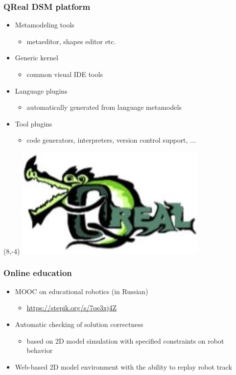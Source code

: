\documentclass[xetex,mathserif,serif]{beamer}
\begin{document}
	\begin{frame}
		\frametitle{QReal DSM platform}
		\begin{itemize}
			\item Metamodeling tools
			\begin{itemize}
				\item metaeditor, shapes editor etc.
			\end{itemize}
			\item Generic kernel
			\begin{itemize}
				\item common visual IDE tools
			\end{itemize}
			\item Language plugins
			\begin{itemize}
				\item automatically generated from language metamodels
			\end{itemize}
			\item Tool plugins
			\begin{itemize}
				\item code generators, interpreters, version control support, ...
			\end{itemize}
		\end{itemize}
		\begin{textblock}{2}(8,-4)
			\includegraphics[width=\textwidth]{qrealLogo.png}
		\end{textblock}
	\end{frame}

	\begin{frame}
		\frametitle{Online education}
		\begin{itemize}
			\item MOOC on educational robotics (in Russian)
			\begin{itemize}
				\item \href{https://stepik.org/s/7qe3xj4Z}{https://stepik.org/s/7qe3xj4Z}
			\end{itemize}
			\item Automatic checking of solution correctness
			\begin{itemize}
				\item based on 2D model simulation with specified constraints on robot behavior
			\end{itemize}
			\item Web-based 2D model environment with the ability to replay robot track
		\end{itemize}
	\end{frame}
\end{document}
